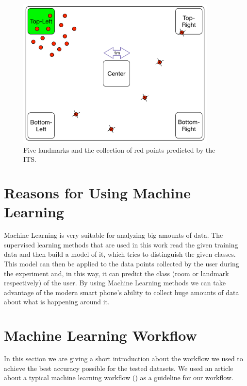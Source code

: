 \begin{figure}[H]
\centering
\includegraphics[width=100mm]{Figures/Landmarks.jpg}
\decoRule
\caption[Landmarks]{Five landmarks and the collection of red points predicted by the ITS.}
\label{fig:LandmarksChapter2}
\end{figure}


\section{Reasons for Using Machine Learning}
Machine Learning is very suitable for analyzing big amounts of data. The supervised learning methods that are used in this work read the given training data and then build a model of it, which tries to distinguish the given classes. This model can then be applied to the data points collected by the user during the experiment and, in this way, it can predict the class (room or landmark respectively) of the user. By using Machine Learning methods we can take advantage of the modern smart phone's ability to collect huge amounts of data about what is happening around it.




\section{Machine Learning Workflow}
\label{sec:MLWorkflow}

In this section we are giving a short introduction about the workflow we used to achieve the best accuracy possible for the tested datasets. We used an article about a typical machine learning workflow (\cite{ml_workflow}) as a guideline for our workflow.

